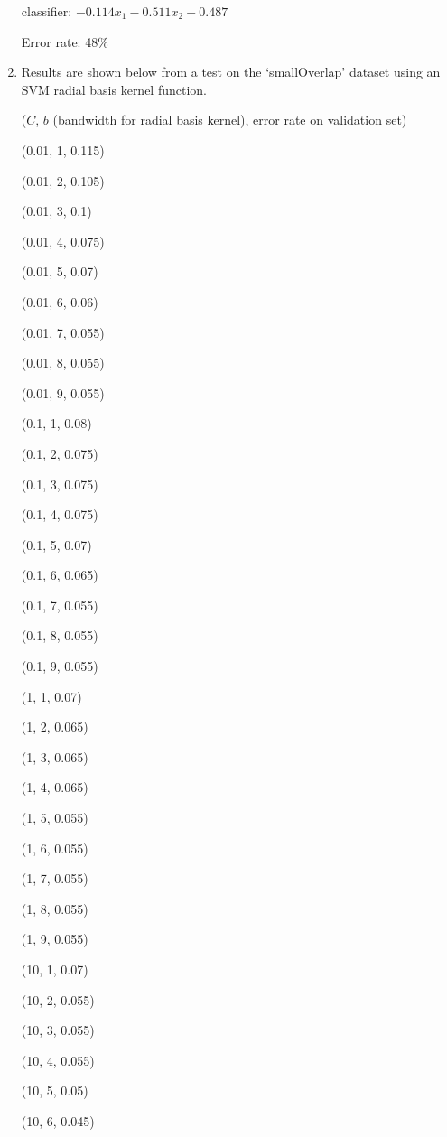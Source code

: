 \documentclass{paper}
\begin{document}
\begin{enumerate}
classifier: $-0.114 x_1 -0.511 x_2 + 0.487$

Error rate: 48\%

    \item

    Results are shown below from a test on the `smallOverlap' dataset using an SVM radial basis kernel function.

    ($C$, $b$ (bandwidth for radial basis kernel), error rate on validation set)
    
    (0.01, 1, 0.115)
    
    (0.01, 2, 0.105)
    
    (0.01, 3, 0.1)
    
    (0.01, 4, 0.075)
    
    (0.01, 5, 0.07)
    
    (0.01, 6, 0.06)
    
    (0.01, 7, 0.055)
    
    (0.01, 8, 0.055)
    
    (0.01, 9, 0.055)
    
    (0.1, 1, 0.08)
    
    (0.1, 2, 0.075)
    
    (0.1, 3, 0.075)
    
    (0.1, 4, 0.075)
    
    (0.1, 5, 0.07)
    
    (0.1, 6, 0.065)
    
    (0.1, 7, 0.055)
    
    (0.1, 8, 0.055)
    
    (0.1, 9, 0.055)
    
    (1, 1, 0.07)
    
    (1, 2, 0.065)
    
    (1, 3, 0.065)
    
    (1, 4, 0.065)
    
    (1, 5, 0.055)
    
    (1, 6, 0.055)
    
    (1, 7, 0.055)
    
    (1, 8, 0.055)
    
    (1, 9, 0.055)
    
    (10, 1, 0.07)
    
    (10, 2, 0.055)
    
    (10, 3, 0.055)
    
    (10, 4, 0.055)
    
    (10, 5, 0.05)
    
    (10, 6, 0.045)
    

\end{enumerate}
\end{document}
